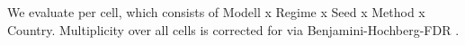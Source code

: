 We evaluate per cell, which consists of Modell x Regime x Seed x Method x Country. Multiplicity over all cells is corrected for via Benjamini-Hochberg-FDR \parencite{benjamini1995fdr}.
%



